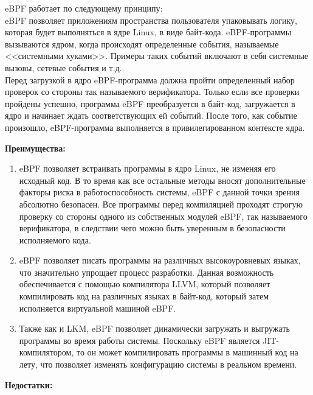 
eBPF работает по следующему принципу:\\%

eBPF позволяет приложениям пространства пользователя упаковывать логику, которая будет выполняться в ядре Linux, в виде байт-кода.
eBPF-программы вызываются ядром, когда происходят определенные события, называемые <<системными хуками>>.
Примеры таких событий включают в себя системные вызовы, сетевые события и т.д.\\
Перед загрузкой в ядро eBPF-программа должна пройти определенный набор проверок со стороны так называемого верификатора.
Только если все проверки пройдены успешно, программа eBPF преобразуется в байт-код, загружается в ядро и начинает ждать соответствующих ей событий.
После того, как событие произошло, eBPF-программа выполняется в привилегированном контексте ядра.

\textbf{Преимущества:}

\begin{enumerate}
    \item eBPF позволяет встраивать программы в ядро Linux, не изменяя его исходный код.
	    В то время как все остальные методы вносят дополнительные факторы риска в работоспособность системы, eBPF с данной точки зрения абсолютно безопасен.
        Все программы перед компиляцией проходят строгую проверку со стороны одного из собственных модулей eBPF, так называемого верификатора, в следствии чего можно быть уверенным в безопасности исполняемого кода.
    \item eBPF позволяет писать программы на различных высокоуровневых языках, что значительно упрощает процесс разработки.
    Данная возможность обеспечивается с помощью компилятора LLVM, который позволяет компилировать код на различных языках в байт-код, который затем исполняется виртуальной машиной eBPF.
    \item Также как и LKM, eBPF позволяет динамически загружать и выгружать программы во время работы системы. %
    Поскольку eBPF является JIT-компилятором, то он может компилировать программы в машинный код на лету, что позволяет изменять конфигурацию системы в реальном времени.
\end{enumerate}

\textbf{Недостатки:}

